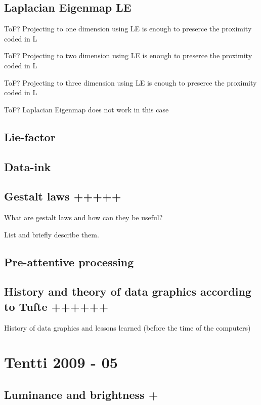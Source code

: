 \documentclass[a4paper]{article}
\begin{document}
\subsection{Laplacian Eigenmap LE}

ToF? Projecting to one dimension using LE is enough to preserce the proximity coded in L

ToF? Projecting to two dimension using LE is enough to preserce the proximity coded in L

ToF? Projecting to three dimension using LE is enough to preserce the proximity coded in L

ToF? Laplacian Eigenmap does not work in this case

\subsection{Lie-factor}

\subsection{Data-ink}

\subsection{Gestalt laws +++++}

What are gestalt laws and how can they be useful?

List and briefly describe them.

\subsection{Pre-attentive processing}

\subsection{History and theory of data graphics according to Tufte ++++++}

History of data graphics and lessons learned (before the time of the computers)

\section{Tentti 2009 - 05}

\subsection{Luminance and brightness +}
\end{document}
